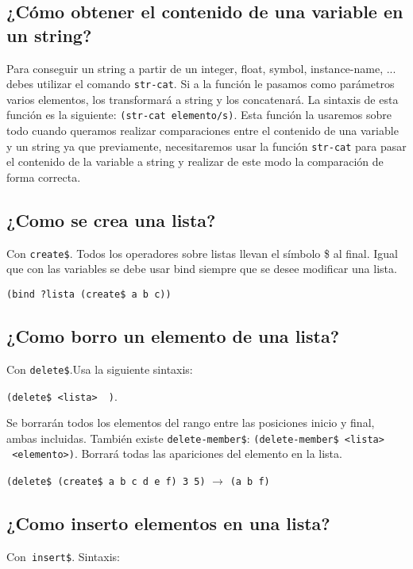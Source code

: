 \documentclass[11pt,svgnames]{scrbook}
\begin{document}
\subsection{¿Cómo obtener el contenido de una variable en un string?}

Para conseguir un string a partir de un integer, float, symbol, instance-name, ... debes utilizar el comando \texttt{str-cat}. Si a la función le pasamos como parámetros varios elementos, los transformará a string y los concatenará. La sintaxis de esta función es la siguiente: \texttt{(str-cat elemento/s)}.
Esta función la usaremos sobre todo cuando queramos realizar comparaciones entre el contenido de una variable y un string ya que previamente, necesitaremos usar la función \texttt{str-cat} para pasar el contenido de la variable a string y realizar de este modo la comparación de forma correcta.


\subsection{¿Como se crea una lista?}

Con \texttt{create\$}. Todos los operadores sobre listas llevan el símbolo \$ al
final. Igual que con las variables se debe usar bind siempre que se desee
modificar una lista.
\medskip

\texttt{(bind ?lista (create\$ a b c))}

\subsection{¿Como borro un elemento de una lista?}

Con \texttt{delete\$}.Usa la siguiente sintaxis: 

\texttt{(delete\$ <lista>\ 
<indice-inicio>\  <indice-final>)}. 

Se borrarán todos los elementos del rango
entre las posiciones inicio y final, ambas incluidas. También existe\break
\texttt{delete-member\$}: \texttt{(delete-member\$ <lista> \  <elemento>)}.
Borrará todas las apariciones del elemento en la lista.
\medskip

\texttt{(delete\$ (create\$ a b c d e f) 3 5)} $\longrightarrow$
 \texttt{(a b f)}

\subsection{¿Como inserto elementos en una lista?}

Con\texttt{ insert\$}. Sintaxis: 
\end{document}
